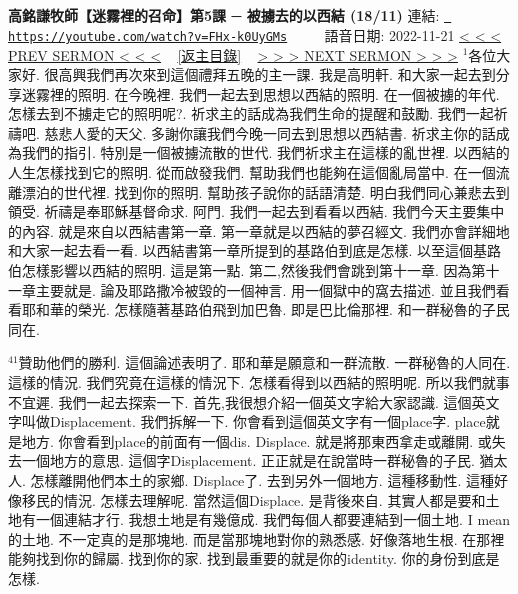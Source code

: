 \documentclass{book}
\begin{document}
\section{}
\label{sec:FHx_k0UyGMs}
\textbf{高銘謙牧師【迷霧裡的召命】第5課 ─ 被擄去的以西結 (18/11)}
\newline
\newline
連結: \href{https://youtube.com/watch?v=FHx-k0UyGMs}{\texttt{ https://youtube.com/watch?v=FHx-k0UyGMs}} ~~~~ 語音日期: 2022-11-21 
\newline
\newline
\hyperref[sec:gfNxrOBd_U0]{\small{< < < PREV SERMON < < <}}
~
\hyperref[sec:index]{\small{[返主目錄]}}
~
\hyperref[sec:P4IZ6PCS8no]{\small{> > > NEXT SERMON > > >}}
\newline
\newline
$^{1}$各位大家好.
很高興我們再次來到這個禮拜五晚的主一課.
我是高明軒.
和大家一起去到分享迷霧裡的照明.
在今晚裡.
我們一起去到思想以西結的照明.
在一個被擄的年代.
怎樣去到不擄走它的照明呢?.
祈求主的話成為我們生命的提醒和鼓勵.
我們一起祈禱吧.
慈悲人愛的天父.
多謝你讓我們今晚一同去到思想以西結書.
祈求主你的話成為我們的指引.
特別是一個被擄流散的世代.
我們祈求主在這樣的亂世裡.
以西結的人生怎樣找到它的照明.
從而啟發我們.
幫助我們也能夠在這個亂局當中.
在一個流離漂泊的世代裡.
找到你的照明.
幫助孩子說你的話語清楚.
明白我們同心兼悲去到領受.
祈禱是奉耶穌基督命求.
阿門.
我們一起去到看看以西結.
我們今天主要集中的內容.
就是來自以西結書第一章.
第一章就是以西結的夢召經文.
我們亦會詳細地和大家一起去看一看.
以西結書第一章所提到的基路伯到底是怎樣.
以至這個基路伯怎樣影響以西結的照明.
這是第一點.
第二,然後我們會跳到第十一章.
因為第十一章主要就是.
論及耶路撒冷被毀的一個神言.
用一個獄中的窩去描述.
並且我們看看耶和華的榮光.
怎樣隨著基路伯飛到加巴魯.
即是巴比倫那裡.
和一群秘魯的子民同在.

$^{41}$贊助他們的勝利.
這個論述表明了.
耶和華是願意和一群流散.
一群秘魯的人同在.
這樣的情況.
我們究竟在這樣的情況下.
怎樣看得到以西結的照明呢.
所以我們就事不宜遲.
我們一起去探索一下.
首先,我很想介紹一個英文字給大家認識.
這個英文字叫做Displacement.
我們拆解一下.
你會看到這個英文字有一個place字.
place就是地方.
你會看到place的前面有一個dis.
Displace.
就是將那東西拿走或離開.
或失去一個地方的意思.
這個字Displacement.
正正就是在說當時一群秘魯的子民.
猶太人.
怎樣離開他們本土的家鄉.
Displace了.
去到另外一個地方.
這種移動性.
這種好像移民的情況.
怎樣去理解呢.
當然這個Displace.
是背後來自.
其實人都是要和土地有一個連結才行.
我想土地是有幾億成.
我們每個人都要連結到一個土地.
I mean的土地.
不一定真的是那塊地.
而是當那塊地對你的熟悉感.
好像落地生根.
在那裡能夠找到你的歸屬.
找到你的家.
找到最重要的就是你的identity.
你的身份到底是怎樣.
\end{document}

